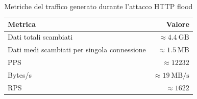 \begin{table}[H]
\centering
    \begin{tabular}{l r}
    \hline
    \textbf{Metrica} & \textbf{Valore} \\
    \hline
    Dati totali scambiati & $\approx4.4\ \text{GB}$ \\
    Dati medi scambiati per singola connessione & $\approx1.5\ \text{MB}$ \\
    PPS &  $\approx12232$\\
    Bytes/s & $\approx19\ \text{MB/s}$ \\
    RPS &   $\approx1622$\\
    \hline
    \end{tabular}
\caption{Metriche del traffico generato durante l’attacco HTTP flood}
\label{metriche_traffico}
\end{table}
